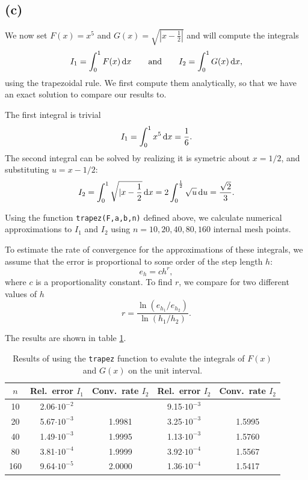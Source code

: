 \documentclass[a4paper, 11pt, notitlepage, english]{article}
\renewcommand{\d}{{\rm d}}
\begin{document}
\subsection*{(c)}
We now set $F(x) = x^5$ and $G(x) = \sqrt{|x-\frac{1}{2}|}$ and will compute the integrals
$$I_1 = \int_0^1 F(x) \, \d x \qquad \mbox{and} \qquad I_2 = \int_0^1 G(x)\, \d x,$$
using the trapezoidal rule. We first compute them analytically, so that we have an exact solution to compare our results to.

The first integral is trivial
$$I_1 = \int_0^1 x^5 \, \d x = \frac{1}{6}.$$
The second integral can be solved by realizing it is symetric about $x=1/2$, and substituting $u=x-1/2$:
$$I_2 = \int_0^1 \sqrt{|x-\frac{1}{2}}\,\d x = 2\int_0^{\frac{1}{2}} \sqrt{u}\, \d u = \frac{\sqrt{2}}{3}.$$


Using the function \verb+trapez(F,a,b,n)+ defined above, we calculate numerical approximations to $I_1$ and $I_2$ using $n=10,20,40,80,160$ internal mesh points.

To estimate the rate of convergence for the approximations of these integrals, we assume that the error is proportional to some order of the step length $h$:
$$e_h = ch^r,$$
where $c$ is a proportionality constant. To find $r$, we compare for two different values of $h$
$$r = \frac{\ln(e_{h_1}/e_{h_2})}{\ln(h_1/h_2)}.$$

The results are shown in table \ref{table:trapez}.

\begin{table}
\centering
    \begin{tabular}{c|c|c|c|c}
        $n$ & Rel.\ error $I_1$ & Conv.\ rate $I_2$ & Rel.\ error $I_2$ & Conv.\ rate $I_2$\\ \hline
10  & 2.06$\cdot 10^{-2}$ &  & 9.15$\cdot 10^{-3}$ \\ \hline
20  & 5.67$\cdot 10^{-3}$ & 1.9981  & 3.25$\cdot 10^{-3}$  & 1.5995\\ \hline
40  & 1.49$\cdot 10^{-3}$ & 1.9995  & 1.13$\cdot 10^{-3}$  & 1.5760\\ \hline
80  & 3.81$\cdot 10^{-4}$ & 1.9999  & 3.92$\cdot 10^{-4}$  & 1.5567\\ \hline
160 & 9.64$\cdot 10^{-5}$ & 2.0000 & 1.36$\cdot 10^{-4}$   & 1.5417 \\ 
    \end{tabular}
    \caption{Results of using the \texttt{trapez} function to evalute the integrals of $F(x)$ and $G(x)$ on the unit interval.\label{table:trapez}}
\end{table}
\end{document}
